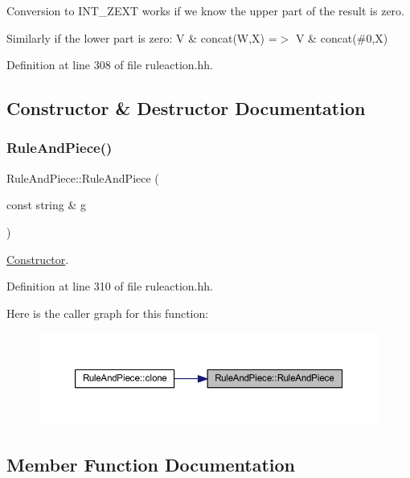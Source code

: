 Conversion to I\+N\+T\+\_\+\+Z\+E\+XT works if we know the upper part of the result is zero.

Similarly if the lower part is zero\+: {\ttfamily V \& concat(\+W,\+X) =$>$ V \& concat(\#0,X)} 

Definition at line 308 of file ruleaction.\+hh.



\subsection{Constructor \& Destructor Documentation}
\mbox{\label{class_rule_and_piece_ab6c41f47671387200f987a3002f94c3f}} 
\subsubsection{\texorpdfstring{RuleAndPiece()}{RuleAndPiece()}}
{\footnotesize\ttfamily Rule\+And\+Piece\+::\+Rule\+And\+Piece (\begin{DoxyParamCaption}\item[{const string \&}]{g }\end{DoxyParamCaption})\hspace{0.3cm}{\ttfamily [inline]}}



\mbox{\hyperlink{class_constructor}{Constructor}}. 



Definition at line 310 of file ruleaction.\+hh.

Here is the caller graph for this function\+:
\nopagebreak
\begin{figure}[H]
\begin{center}
\leavevmode
\includegraphics[width=350pt]{class_rule_and_piece_ab6c41f47671387200f987a3002f94c3f_icgraph}
\end{center}
\end{figure}


\subsection{Member Function Documentation}
\mbox{\label{class_rule_and_piece_a21d9a8514b5713b5899f9f84f93b0156}} 
